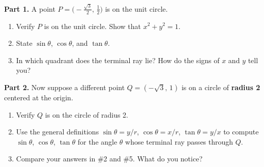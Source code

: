 \documentclass[10pt]{article}
\begin{document}
\vspace{0.14in}

\begin{tcolorbox}[colback=white, colframe=black!40,
    title=\textbf{Tier A --- On Level: A Point on the Unit Circle and Beyond},
    fonttitle=\bfseries, arc=2mm, left=4mm, right=4mm, top=3mm, bottom=3mm]

\textbf{Part 1.} A point $P = \bigl(-\tfrac{\sqrt{3}}{2},\, \tfrac{1}{2}\bigr)$ is on the unit circle.

\begin{enumerate}[leftmargin=1.8em, itemsep=4pt]
  \item Verify $P$ is on the unit circle. Show that $x^2 + y^2 = 1$. \vspace{0.35in}
  \item State $\sin\theta$, $\cos\theta$, and $\tan\theta$. \vspace{0.35in}
  \item In which quadrant does the terminal ray lie? How do the signs of $x$ and $y$ tell you? \vspace{0.35in}
\end{enumerate}

\textbf{Part 2.} Now suppose a different point $Q = (-\sqrt{3},\, 1)$ is on a circle of \textbf{radius 2}
centered at the origin.

\begin{enumerate}[leftmargin=1.8em, itemsep=4pt, start=4]
  \item Verify $Q$ is on the circle of radius 2. \vspace{0.30in}
  \item Use the general definitions $\sin\theta = y/r$, $\cos\theta = x/r$, $\tan\theta = y/x$
        to compute $\sin\theta$, $\cos\theta$, $\tan\theta$ for the angle $\theta$ whose terminal
        ray passes through $Q$. \vspace{0.35in}
  \item Compare your answers in \#2 and \#5. What do you notice? \vspace{0.25in}
\end{enumerate}
\end{tcolorbox}

\vspace{0.14in}
\end{document}
